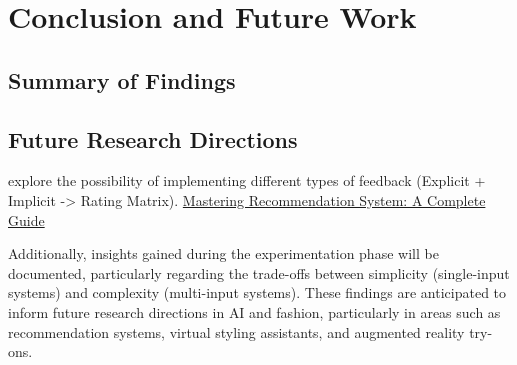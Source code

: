 \chapter{Conclusion and Future Work}
\section{Summary of Findings}
\section{Future Research Directions}


explore the possibility of implementing different types of feedback (Explicit + Implicit -> Rating Matrix). \href{https://learnopencv.com/recommendation-system/}{Mastering Recommendation System: A Complete Guide}

Additionally, insights gained during the experimentation phase will be documented, particularly regarding the trade-offs between simplicity (single-input systems) and complexity (multi-input systems). These findings are anticipated to inform future research directions in \acs{AI} and fashion, particularly in areas such as recommendation systems, virtual styling assistants, and augmented reality try-ons.